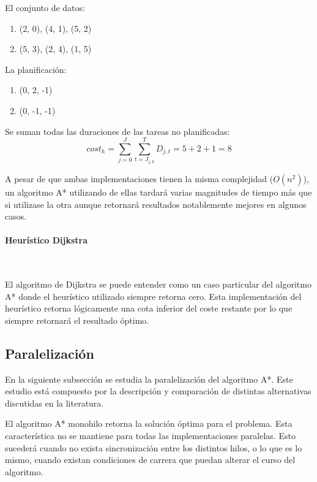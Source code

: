 \begin{examplebox}
    El conjunto de datos:
    \begin{enumerate}[itemsep=0.25px]
        \item (2, 0), (4, 1), (5, 2)
        \item (5, 3), (2, 4), (1, 5)
    \end{enumerate}
    La planificación:
    \begin{enumerate}[itemsep=0.25px]
        \item (0, 2, -1)
        \item (0, -1, -1)
    \end{enumerate}

    Se suman todas las duraciones de las tareas no planificadas:
    $$
    cost_h = \sum_{j=0}^{J}{\sum_{t=J_{j,k}}^{T}{D_{j,t}}}
    = 5 + 2 + 1 = 8
    $$ 
\end{examplebox}

\begin{notebox}
    A pesar de que ambas implementaciones tienen la misma complejidad ($O(n^2)$),
    un algoritmo A* utilizando de ellas tardará varias magnitudes de tiempo más que
    si utilizase la otra aunque retornará resultados notablemente mejores en algunos casos.
\end{notebox}

\paragraph{Heurístico Dijkstra}~

El algoritmo de Dijkstra se puede entender como un caso
particular del algoritmo A* donde
el heurístico utilizado siempre retorna cero.
Esta implementación del heurístico retorna lógicamente
una cota inferior del coste restante
por lo que siempre retornará el resultado óptimo.

\pagebreak

\subsection{Paralelización}

En la siguiente subsección
se estudia la paralelización
del algoritmo A*.
Este estudio está compuesto por la descripción y
comparación de distintas alternativas discutidas en
la literatura.

El algoritmo A* monohilo retorna la solución óptima
para el problema.
Esta característica no se mantiene para todas las
implementaciones paralelas.
Esto sucederá cuando no exista sincronización
entre los distintos hilos,
o lo que es lo mismo,
cuando existan condiciones de carrera
que puedan alterar el curso del algoritmo.

